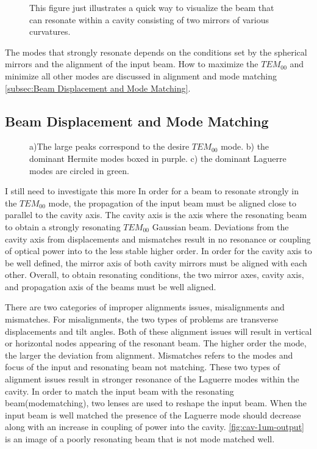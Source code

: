\documentclass[11pt,a4paper]{book}
\newcommand{\imginput}[1]{} %
\begin{document}
			\begin{figure} [!ht]
				\centering
				\def\svgwidth{\columnwidth}
				\resizebox{160mm}{!}{\imginput{images/cav-types.pdf_tex}}
				\caption{This figure just illustrates a quick way to visualize the beam that can resonate within a cavity consisting of two mirrors of various curvatures.
				}
				\label{fig:cav-types}
			\end{figure}	
			
			The modes that strongly resonate depends on the conditions set by the spherical mirrors and the alignment of the input beam.
			How to maximize the $TEM_{00}$ and minimize all other modes are discussed in alignment and mode matching \autoref{subsec:Beam Displacement and Mode Matching}.
		
		\subsection {Beam Displacement and Mode Matching}
			\label{subsec:Beam Displacement and Mode Matching}
			
			\begin{figure} [!ht]
				\centering
				\def\svgwidth{\columnwidth}
				\resizebox{150mm}{!}{\imginput{images/cav-1um-output.pdf_tex}}
				\caption{a)The large peaks correspond to the desire $TEM_{00}$ mode. b) the dominant Hermite modes boxed in purple. c) the dominant Laguerre modes are circled in green.
				}
				\label{fig:cav-1um-output}
			\end{figure}		
			I still need to investigate this more
			In order for a beam to resonate strongly in the $TEM_{00}$ mode, the propagation of the input beam must be aligned close to parallel to the cavity axis.
			The cavity axis is the axis where the resonating beam to obtain a strongly resonating $TEM_{00}$ Gaussian beam. Deviations from the cavity axis from displacements and mismatches result in no resonance or coupling of optical power into to the less stable higher order. In order for the cavity axis to be well defined, the mirror axis of both cavity mirrors must be aligned with each other. Overall, to obtain resonating conditions, the two mirror axes, cavity axis, and propagation axis of the beams must be well aligned.
			
			There are two categories of improper alignments issues, misalignments and mismatches. For misalignments, the two types of problems are transverse displacements and tilt angles. Both of these alignment issues will result in vertical or horizontal nodes appearing of the resonant beam. The higher order the mode, the larger the deviation from alignment. 
			Mismatches refers to the modes and focus of the input and resonating beam not matching. These two types of alignment issues result in stronger resonance of the Laguerre modes within the cavity. In order to match the input beam with the resonating beam(modematching), two lenses are used to reshape the input beam. When the input beam is well matched the presence of the Laguerre mode should decrease along with an increase in coupling of power into the cavity. \autoref{fig:cav-1um-output} is an image of a poorly resonating beam that is not mode matched well.
			
\end{document}

